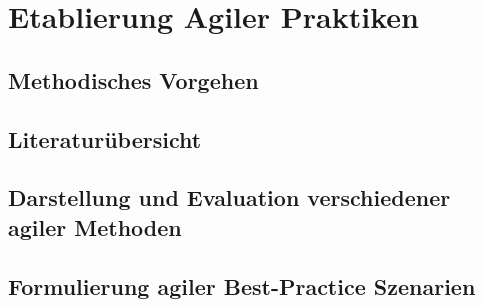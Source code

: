 \chapter{Etablierung Agiler Praktiken}
\label{agilepractices}

\todots

\section{Methodisches Vorgehen}

\todots

\section{Literaturübersicht}

\todots

\section{Darstellung und Evaluation verschiedener agiler Methoden}

\todots

\section{Formulierung agiler Best-Practice Szenarien}

\todots



